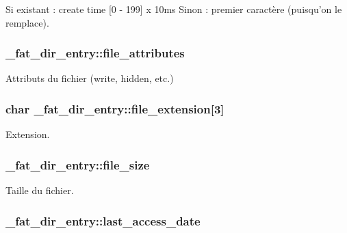 Si existant \+: create time \mbox{[}0 -\/ 199\mbox{]} x 10ms Sinon \+: premier caractère (puisqu'on le remplace). \hypertarget{struct__fat__dir__entry_a4672718a4c89a279dd1c2b083ea73789}{
\subsubsection[{file\+\_\+attributes}]{ \+\_\+fat\+\_\+dir\+\_\+entry\+::file\+\_\+attributes}}\label{struct__fat__dir__entry_a4672718a4c89a279dd1c2b083ea73789}
Attributs du fichier (write, hidden, etc.) \hypertarget{struct__fat__dir__entry_addf0d1b2feefb5d50d90ea66b06703b9}{
\subsubsection[{file\+\_\+extension}]{\setlength{\rightskip}{0pt plus 5cm}char \+\_\+fat\+\_\+dir\+\_\+entry\+::file\+\_\+extension\mbox{[}3\mbox{]}}}\label{struct__fat__dir__entry_addf0d1b2feefb5d50d90ea66b06703b9}
Extension. \hypertarget{struct__fat__dir__entry_a557cd14b001d64851ad5e7cadb742411}{
\subsubsection[{file\+\_\+size}]{ \+\_\+fat\+\_\+dir\+\_\+entry\+::file\+\_\+size}}\label{struct__fat__dir__entry_a557cd14b001d64851ad5e7cadb742411}
Taille du fichier. \hypertarget{struct__fat__dir__entry_aa53da680ae2a6594c0f956c80a1b8ca4}{
\subsubsection[{last\+\_\+access\+\_\+date}]{ \+\_\+fat\+\_\+dir\+\_\+entry\+::last\+\_\+access\+\_\+date}}\label{struct__fat__dir__entry_aa53da680ae2a6594c0f956c80a1b8ca4}

